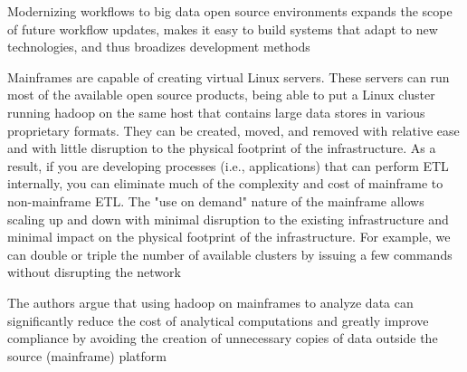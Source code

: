 \documentclass[a4paper,twoside]{scrbook}
\begin{document}
Modernizing workflows to big data open source environments expands the scope of future workflow updates, makes it easy to build systems that adapt to new technologies, and thus broadizes development methods
\par
Mainframes are capable of creating virtual Linux servers. These servers can run most of the available open source products, being able to put a Linux cluster running hadoop on the same host that contains large data stores in various proprietary formats.
They can be created, moved, and removed with relative ease and with little disruption to the physical footprint of the infrastructure. As a result, if you are developing processes (i.e., applications) that can perform ETL internally, you can eliminate much of the complexity and cost of mainframe to non-mainframe ETL.
The "use on demand" nature of the mainframe allows scaling up and down with minimal disruption to the existing infrastructure and minimal impact on the physical footprint of the infrastructure. For example, we can double or triple the number of available clusters by issuing a few commands without disrupting the network
\par
The authors argue that using hadoop on mainframes to analyze data can significantly reduce the cost of analytical computations and greatly improve compliance by avoiding the creation of unnecessary copies of data outside the source (mainframe) platform
\end{document}
